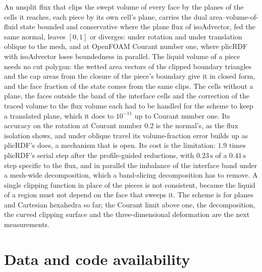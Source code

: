 \documentclass[preprint,12pt]{elsarticle}
\begin{document}
An unsplit flux that clips the swept volume of every face by the planes of the cells it reaches, each piece by its own cell's plane, carries the dual area--volume-of-fluid state bounded and conservative where the plane flux of isoAdvector, fed the same normal, leaves $[0, 1]$ or diverges: under rotation and under translation oblique to the mesh, and at OpenFOAM Courant number one, where plicRDF with isoAdvector loses boundedness in parallel. The liquid volume of a piece needs no cut polygon: the wetted area vectors of the clipped boundary triangles and the cap areas from the closure of the piece's boundary give it in closed form, and the face fraction of the state comes from the same clips. The cells without a plane, the faces outside the band of the interface cells and the correction of the traced volume to the flux volume each had to be handled for the scheme to keep a translated plane, which it does to $10^{-11}$ up to Courant number one. Its accuracy on the rotation at Courant number $0.2$ is the normal's, as the flux isolation shows, and under oblique travel its volume-fraction error builds up as plicRDF's does, a mechanism that is open. Its cost is the limitation: $1.9$ times plicRDF's serial step after the profile-guided reductions, with $0.23\,\mathrm{s}$ of a $0.41\,\mathrm{s}$ step specific to the flux, and in parallel the imbalance of the interface band under a mesh-wide decomposition, which a band-slicing decomposition has to remove. A single clipping function in place of the pieces is not consistent, because the liquid of a region must not depend on the face that sweeps it. The scheme is for planes and Cartesian hexahedra so far; the Courant limit above one, the decomposition, the curved clipping surface and the three-dimensional deformation are the next measurements.

\section*{Data and code availability}
\label{sec:data}
\end{document}
